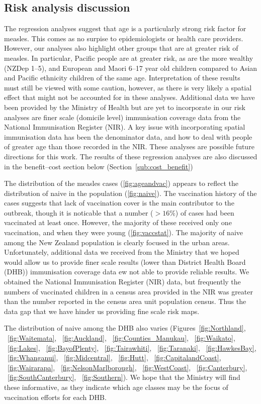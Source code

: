 \documentclass{article}
\begin{document}
\subsection{Risk analysis discussion}

The regression analyses suggest that age is a particularly strong risk factor for measles. This comes as no surpise to epidemiologists or health care providers. However, our analyses also highlight other groups that are at greater risk of measles. In particular, Pacific people are at greater risk, as are the more wealthy (NZDep 1--5), and European and Maori 6--17 year old children compared to Asian and Pacific ethnicity children of the same age. Interpretation of these results must still be viewed with some caution, however, as there is very likely a spatial effect that might not be accounted for in these analyses. Additional data we have been provided by the Ministry of Health but are yet to incorporate in our risk analyses are finer scale (domicile level) immunisation coverage data from the National Immunisation Register (NIR). A key issue with incorporating spatial immunisation data has been the denominator data, and how to deal with people of greater age than those recorded in the NIR. These analyses are possible future directions for this work. The results of these regression analyses are also discussed in the benefit--cost section below (Section~\ref{sub:cost_benefit})

The distribution of the measles cases (\ref{fig:ageandvac}) appears to reflect the distribution of naive in the population (\ref{fig:naive}). The vaccination history of the cases suggests that lack of vaccination cover is the main contributor to the outbreak, though it is noticable that a number ($>16\%$) of cases had been vaccinated at least once. However, the majority of these received only one vaccination, and when they were young (\ref{fig:vaccstat}). The majority of naive among the New Zealand population is clearly focused in the urban areas. Unfortunately, additional data we received from the Ministry that we hoped would allow us to provide finer scale results (lower than District Health Board (DHB)) immunisation coverage data ew not able to provide reliable results. We obtained the National Immunisation Register (NIR) data, but frequently the numbers of vaccinated children in a census area provided in the NIR was greater than the number reported in the census area unit population census. Thus the data gap that we have hinder us providing fine scale risk maps.

The distribution of naive among the DHB also varies (Figures~\ref{fig:Northland}, ~\ref{fig:Waitemata}, ~\ref{fig:Auckland}, ~\ref{fig:Counties_Manukau}, ~\ref{fig:Waikato}, ~\ref{fig:Lakes}, ~\ref{fig:BayofPlenty}, ~\ref{fig:Tairawhiti}, ~\ref{fig:Taranaki}, ~\ref{fig:HawkesBay}, ~\ref{fig:Whanganui}, ~\ref{fig:Midcentral}, ~\ref{fig:Hutt}, ~\ref{fig:CapitalandCoast}, ~\ref{fig:Wairarapa}, ~\ref{fig:NelsonMarlborough}, ~\ref{fig:WestCoast}, ~\ref{fig:Canterbury}, ~\ref{fig:SouthCanterbury}, ~\ref{fig:Southern}). We hope that the Ministry will find these informative, as they indicate which age classes may be the focus of vaccination efforts for each DHB.
\end{document}
